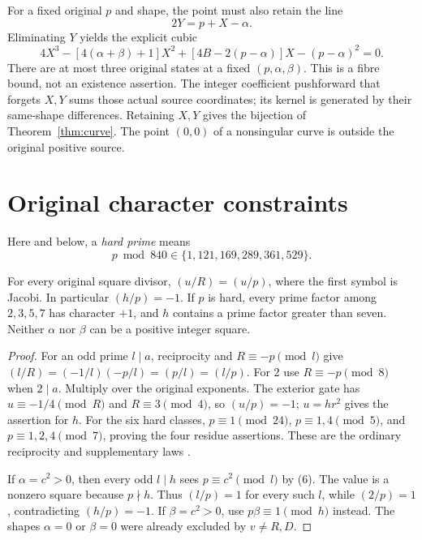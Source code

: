 For a fixed original $p$ and shape, the point must also retain the line
\[
 \boxed{2Y=p+X-\alpha.}                                  \tag{8}
\]
Eliminating $Y$ yields the explicit cubic
\[
 4X^3-[4(\alpha+\beta)+1]X^2+
 [4B-2(p-\alpha)]X-(p-\alpha)^2=0.                        \tag{9}
\]
There are at most three original states at a fixed $(p,\alpha,\beta)$.
This is a fibre bound, not an existence assertion. The integer coefficient
pushforward that forgets $X,Y$ sums those actual source coordinates; its kernel
is generated by their same-shape differences. Retaining $X,Y$ gives the
bijection of Theorem~\ref{thm:curve}. The point $(0,0)$ of a nonsingular curve is
outside the original positive source.

\section{Original character constraints}
Here and below, a \emph{hard prime} means
\[
 p\bmod840\in\{1,121,169,289,361,529\}.
\]
\begin{lemma}\label{lem:char}
For every original square divisor, $(u/R)=(u/p)$, where the first symbol is
Jacobi. In particular $(h/p)=-1$. If $p$ is hard, every prime factor among
$2,3,5,7$ has character $+1$, and $h$ contains a prime factor greater than seven.
Neither $\alpha$ nor $\beta$ can be a positive integer square.
\end{lemma}
\begin{proof}
For an odd prime $l\mid a$, reciprocity and $R\equiv-p\pmod l$ give
$(l/R)=(-1/l)(-p/l)=(p/l)=(l/p)$. For 2 use $R\equiv-p\pmod8$ when $2\mid a$.
Multiply over the original exponents. The exterior gate has $u\equiv-1/4\pmod R$
and $R\equiv3\pmod4$, so $(u/p)=-1$; $u=hr^2$ gives the assertion for $h$.
For the six hard classes, $p\equiv1\pmod{24}$, $p\equiv1,4\pmod5$, and
$p\equiv1,2,4\pmod7$, proving the four residue assertions.
These are the ordinary reciprocity and supplementary laws \cite[\S6.4]{Hatcher}.

If $\alpha=c^2>0$, then every odd $l\mid h$ sees $p\equiv c^2\pmod l$ by (6).
The value is a nonzero square because $p\nmid h$. Thus $(l/p)=1$ for every such
$l$, while $(2/p)=1$, contradicting $(h/p)=-1$. If $\beta=c^2>0$, use
$p\beta\equiv1\pmod h$ instead. The shapes $\alpha=0$ or $\beta=0$ were already
excluded by $v\ne R,D$.
\end{proof}

